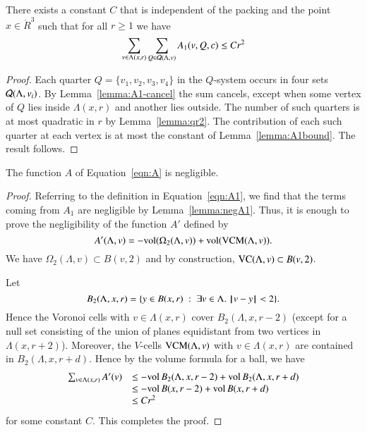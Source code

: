 \begin{lemma}\label{lemma:negA1} There exists a constant $C$ that is independent of
the packing and the point $x\in\ring{R}^3$ such that for
all $r\ge 1$ we have
$$\sum_{v\in\Lambda(x,r)} \sum_{Q\in{\mathcal Q}(\Lambda,v)}
      A_1 (v,Q,c) \le C r^2$$
\end{lemma}

\begin{proof}
Each quarter $Q=\{v_1,v_2,v_3,v_4\}$ in the $Q$-system occurs in
four sets ${\mathcal Q}(\Lambda,v_i)$.  By
Lemma~\ref{lemma:A1-cancel} the sum cancels, except when some
vertex of $Q$ lies inside $\Lambda(x,r)$ and another lies outside.
The number of such quarters is at most quadratic in $r$ by
Lemma~\ref{lemma:qr2}.  The contribution of each such quarter at
each vertex is at most the constant of Lemma~\ref{lemma:A1bound}.
The result follows.
\end{proof}

\begin{theorem}\label{lemma:negligible}
The function $A$ of Equation~\ref{eqn:A} is negligible.
\end{theorem}

\begin{proof}   
Referring to the definition in Equation~\ref{eqn:A1}, we find that
the terms coming from $A_1$ are negligible by
Lemma~\ref{lemma:negA1}.  Thus, it is enough to prove the
negligibility of the function $A'$ defined by
      $$
      A'(\Lambda,v) = -{\operatorname{vol}}(\Omega_2(\Lambda,v))+
         {\operatorname{vol}}({\operatorname{VCM}}(\Lambda,v)).$$
We
have $\Omega_2(\Lambda,v)\subset B(v,2)$ and by
construction, 
${\operatorname{VC}}(\Lambda,v)\subset B(v,2)$. 

Let 
  $$
  B_2(\Lambda,x,r) = \{y \in B(x,r)\mid \exists v\in \Lambda.\ 
         \norm{v}{y} < 2\}.
  $$
Hence the Voronoi cells with
$v\in \Lambda(x,r)$ cover $B_2(\Lambda,x,r-2)$ (except for a null set
consisting of the union of planes equidistant from two vertices in
$\Lambda(x,r+2)$). Moreover, the $V$-cells ${\operatorname{VCM}}(\Lambda,v)$
with $v\in \Lambda(x,r)$ are contained in $B_2(\Lambda,x,r+d)$.  Hence by
the volume formula for a ball, we have
   $$
   \begin{array}{lll}
   \sum_{v\in\Lambda(x,r)} A'(v) &\le 
     -{\operatorname{vol}}\,B_2(\Lambda,x,r-2)
      +{\operatorname{vol}}\,B_2(\Lambda,x,r+d)\\&\le 
       -{\operatorname{vol}}\,B(x,r-2)
      +{\operatorname{vol}}\,B(x,r+d)\\& \le 
      C r^2
      \end{array}
   $$
for some constant $C$. This completes the proof.
\end{proof}



